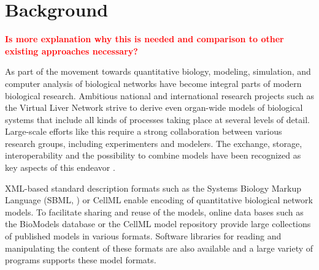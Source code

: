 \documentclass[10pt]{bmc_article}
\newenvironment{bmcformat}{\baselineskip20pt\sloppy\setboolean{publ}{false}}{\baselineskip20pt\sloppy}
\newcommand{\TODO}[1]{\textcolor{red}{\textbf{#1}}}
\begin{document}
\begin{bmcformat}






\section*{Background}

\TODO{Is more explanation why this is needed and comparison to other existing
approaches necessary?}

As part of the movement towards quantitative biology, modeling, 
simulation, and computer analysis of biological networks have become integral
parts of modern biological research. Ambitious national and international
research projects such as the Virtual Liver Network \cite{Holzhuetter2012}
strive to derive even organ-wide models of biological systems that include all
kinds of processes taking place at several levels of detail. Large-scale efforts
like this require a strong collaboration between various research groups,
including experimenters and modelers. The exchange, storage, interoperability
and the possibility to combine models have been recognized as key aspects of
this endeavor \cite{Liebermeister2009sta}.

XML-based standard description formats \cite{Bray2000} such as the Systems
Biology Markup Language (SBML, \cite{Hucka2004}) or CellML \cite{Lloyd2004}
enable encoding of quantitative biological network models.
To facilitate sharing and reuse of the models, online data bases such as the
BioModels database \cite{Novere2006a} or the CellML model repository
\cite{Lloyd2008} provide large collections of published models in various
formats.
Software libraries for reading and manipulating the content
of these formats are also available \cite{Bornstein2008, Miller2010,
Draeger2011b} and a large variety of programs supports these model formats.


\end{bmcformat}
\end{document}

